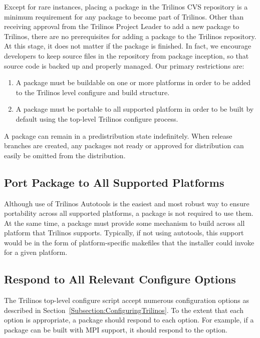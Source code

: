 \documentclass[12pt,strict]{TrilinosDevGuide}
\begin{document}
Except for rare instances, placing a package in the Trilinos CVS
repository is a minimum requirement for any package to become part of 
Trilinos.  Other than receiving approval from the Trilinos Project Leader to 
add a new package to Trilinos, there are no prerequisites for adding a  
package to the Trilinos repository.  At this stage, it does not matter if the 
package is finished.  In fact, we encourage
developers to keep source files in the repository from package
inception, so that source code is backed up and properly managed.
Our primary restrictions are:
\begin{enumerate}
\item A package must be buildable on one or more platforms in order to
be added to the Trilinos level configure and build 
structure.  
\item A package must be portable to all supported platform in order to
be built by default using the top-level Trilinos configure process.
\end{enumerate}
A package can remain in a predistribution state indefinitely.  
When release branches are created, any packages not ready or approved for 
distribution can easily be omitted from the distribution.

\subsection{Port Package to All Supported Platforms}
Although use of Trilinos Autotools is the easiest and most robust way
to ensure portability across all supported platforms, a package is not
required to use them.  At the same time, a package must provide some
mechanism to build across all platform that Trilinos supports.
Typically, if not using autotools, this support would be in the form
of platform-specific makefiles that the installer could invoke for a
given platform.

\subsection{Respond to All Relevant Configure Options}

The Trilinos top-level configure script accept numerous configuration
options as described in Section~\ref{Subsection:ConfiguringTrilinos}.
To the extent that each option is appropriate, a package should
respond to each option.  For example, if a package can be built with
MPI support, it should respond to the  option.
\end{document}
